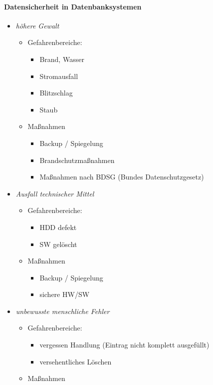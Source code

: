 \paragraph{Datensicherheit in Datenbanksystemen}
\begin{itemize}
\item \emph{höhere Gewalt}
\begin{itemize}
\item Gefahrenbereiche:
\begin{itemize}
\item Brand, Wasser
\item Stromausfall
\item Blitzschlag
\item Staub
\end{itemize}
\item Maßnahmen
\begin{itemize}
\item Backup / Spiegelung
\item Brandschutzmaßnahmen
\item Maßnahmen nach BDSG (Bundes Datenschutzgesetz)
\end{itemize}
\end{itemize}
\item \emph{Ausfall technischer Mittel}
\begin{itemize}
\item Gefahrenbereiche:
\begin{itemize}
\item HDD defekt
\item SW gelöscht
\end{itemize}
\item Maßnahmen
\begin{itemize}
\item Backup / Spiegelung
\item sichere HW/SW
\end{itemize}
\end{itemize}
\item \emph{unbewusste menschliche Fehler}
\begin{itemize}
\item Gefahrenbereiche:
\begin{itemize}
\item vergessen Handlung (Eintrag nicht komplett ausgefüllt)
\item versehentliches Löschen
\end{itemize}
\item Maßnahmen
\begin{itemize}

\end{itemize}
\end{itemize}
\end{itemize}
